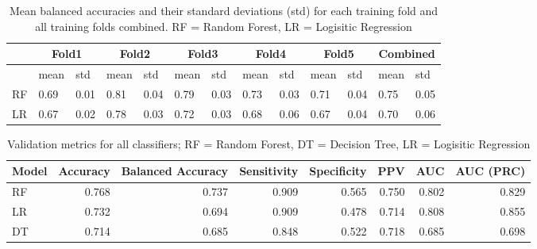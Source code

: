 \begin{table}
\centering
\begin{tabular}{lllllllllllll}
 &
  \multicolumn{2}{c}{Fold1} &
  \multicolumn{2}{c}{Fold2} &
  \multicolumn{2}{c}{Fold3} &
  \multicolumn{2}{c}{Fold4} &
  \multicolumn{2}{c}{Fold5} &
  \multicolumn{2}{c}{Combined} \\ \hline
   & mean & std  & mean & std  & mean & std  & mean & std  & mean & std  & mean 
& std  \\ \hline
RF & 0.69 & 0.01 & 0.81 & 0.04 & 0.79 & 0.03 & 0.73 & 0.03 & 0.71 & 0.04 & 0.75 
& 0.05 \\
LR & 0.67 & 0.02 & 0.78 & 0.03 & 0.72 & 0.03 & 0.68 & 0.06 & 0.67 & 0.04 & 0.70 
& 0.06
\end{tabular}
\caption{Mean balanced accuracies and their standard deviations (std) 
for each training fold and all training folds combined. RF = Random Forest, 
LR = Logisitic Regression }
\label{tab:training-b_acc}
\end{table}
\begin{table}
\centering
\begin{tabular}{lrrrrrrr}
Model & Accuracy & Balanced Accuracy & Sensitivity & Specificity & PPV 
& AUC &  AUC (PRC) \\ \hline
   RF & 0.768 &  0.737 &        0.909 &        0.565 & 0.750 & 0.802 &        
0.829 \\
   LR & 0.732 &  0.694 &        0.909 &        0.478 & 0.714 & 0.808 &        
0.855 \\
   DT & 0.714 &  0.685 &        0.848 &        0.522 & 0.718 & 0.685 &        
0.698 \\
\end{tabular}
\caption{Validation metrics for all classifiers; RF = Random Forest, DT = 
Decision Tree, LR = Logisitic Regression}
\label{tab:validation-metrics}
\end{table}







